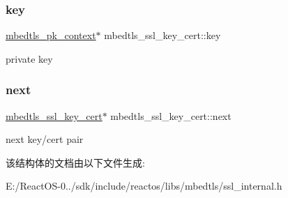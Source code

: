 \subsubsection{\texorpdfstring{key}{key}}
{\footnotesize\ttfamily \hyperlink{structmbedtls__pk__context}{mbedtls\+\_\+pk\+\_\+context}$\ast$ mbedtls\+\_\+ssl\+\_\+key\+\_\+cert\+::key}

private key \mbox{\label{structmbedtls__ssl__key__cert_ac8969b0a63df001f997cab96154db160}} 
\subsubsection{\texorpdfstring{next}{next}}
{\footnotesize\ttfamily \hyperlink{structmbedtls__ssl__key__cert}{mbedtls\+\_\+ssl\+\_\+key\+\_\+cert}$\ast$ mbedtls\+\_\+ssl\+\_\+key\+\_\+cert\+::next}

next key/cert pair 

该结构体的文档由以下文件生成\+:\begin{DoxyCompactItemize}
\item 
E\+:/\+React\+O\+S-\/0../sdk/include/reactos/libs/mbedtls/ssl\+\_\+internal.\+h\end{DoxyCompactItemize}

